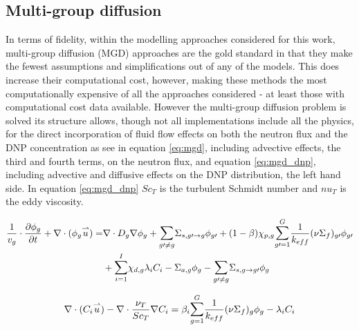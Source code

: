 \documentclass[review]{elsarticle}
\begin{document}
\subsection{Multi-group diffusion} \label{ssec:mgd}
In terms of fidelity, within the modelling approaches considered for this
work, multi-group diffusion (MGD) approaches are the gold standard in that they
make the fewest assumptions and simplifications out of any of the models.
This does increase their computational cost, however, making these methods
the most computationally expensive of all the approaches considered - at least
those with computational cost data available. However the multi-group
diffusion problem is solved its structure allows, though not all implementations
include all the physics, for the direct incorporation
of fluid flow effects on both the neutron flux and the DNP concentration as
see in equation \ref{eq:mgd}, including advective effects, the third and
fourth terms, on the neutron flux,
 and equation \ref{eq:mgd_dnp}, including advective and diffusive effects on
 the DNP distribution, the left hand side. In equation \ref{eq:mgd_dnp}
 $Sc_{T}$ is the turbulent Schmidt number and $nu_{T}$ is the eddy viscosity. 

\begin{equation}
\label{eq:mgd}
\begin{split}
\frac{1}{v_{g}} \cdot \frac{\partial \phi_{g}}{\partial t} + \nabla \cdot
    (\phi_{g} \overset{\rightharpoonup}u) = & \nabla \cdot D_{g} \nabla \phi_{g}
    + \mathlarger{\sum}_{g \prime \not= g} \Sigma_{s,g \prime \rightarrow g}
    \phi_{g \prime} + (1-\beta)\chi_{p,g}
    \mathlarger{\sum}_{g \prime = 1}^{G}\frac{1}{k_{eff}}
    (\nu \Sigma_{f})_{g \prime}\phi_{g\prime}\\ & + 
    \mathlarger{\sum}_{i = 1}^{I}\chi_{d,g}\lambda_{i}C_{i} 
     - \Sigma_{a,g}\phi_{g} - \mathlarger{\sum}_{g \prime \not= g} 
    \Sigma_{s,g \rightarrow g \prime} \phi_{g} 
\end{split}
\end{equation}

\begin{equation}
\label{eq:mgd_dnp}
\nabla \cdot (C_{i} \overset{\rightharpoonup}u) - 
    \nabla \cdot \frac{\nu_{T}}{Sc_{T}}\nabla C_{i}
    = \beta_{i} \mathlarger{\sum}_{g = 1}^{G} \frac{1}{k_{eff}} 
    (\nu \Sigma_{f})_{g} \phi_{g} - \lambda_{i} C_{i}
\end{equation}
\end{document}
